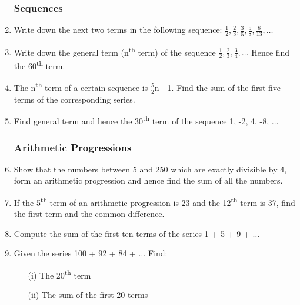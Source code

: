 \begin{enumerate}


		\subsubsection{Sequences}
		
	\item Write down the next two terms in the following sequence: $\frac{1}{2}, \frac{2}{3}, \frac{3}{5}, \frac{5}{8}, \frac{8}{13}, \ldots$
	
	\item Write down the general term (n\textsuperscript{th} term) of the sequence $\frac{1}{2}, \frac{2}{3}, \frac{3}{4}, \ldots$ Hence find the 60\textsuperscript{th} term.
	
	\item The n\textsuperscript{th} term of a certain sequence is $\frac{5}{2}$n - 1. Find the sum of the first five terms of the corresponding series.
	
	\item Find general term and hence the 30\textsuperscript{th} term of the sequence 1, -2, 4, -8, $\ldots$
	
	

		\subsubsection{Arithmetic Progressions}
		
	\item Show that the numbers between 5 and 250 which are exactly divisible by 4, form an arithmetic progression and hence find the sum of all the numbers.
	
	\item If the 5\textsuperscript{th} term of an arithmetic progression is 23 and the 12\textsuperscript{th} term is 37, find the first term and the common difference.
	
	\item Compute the sum of the first ten terms of the series 1 + 5 + 9 + $\ldots$
	
	\item Given the series 100 + 92 + 84 + $\ldots$ Find:
		\begin{itemize}
		\item[(i)] The 20\textsuperscript{th} term
		\item[(ii)] The sum of the first 20 terms
		\end{itemize}
		

\end{enumerate}
